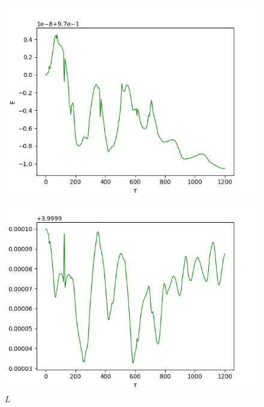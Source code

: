 \documentclass[10pt,a4paper]{report}
\begin{document}
\begin{figure}[!ht]
\begin{minipage}[b]{0.5\linewidth}
\centering
\includegraphics[width=\textwidth]{3a/E.png}
\caption{$E$}
\label{fig:figure1}
\end{minipage}
\hspace{0.5cm}
\begin{minipage}[b]{0.5\linewidth}
\centering
\includegraphics[width=\textwidth]{3a/L.png}
\caption{$L$}
\label{fig:figure2}
\end{minipage}
\end{figure}
\end{document}
